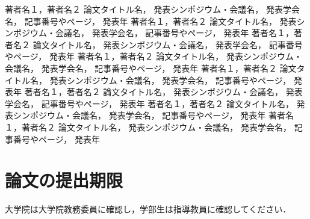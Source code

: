 \documentclass[a4paper]{jsarticle}
\begin{document}
\begin{thebibliography}{999}
  著者名１，著者名２
  論文タイトル名，
  発表シンポジウム・会議名，
  発表学会名，
  記事番号やページ，
  発表年
  著者名１，著者名２
  論文タイトル名，
  発表シンポジウム・会議名，
  発表学会名，
  記事番号やページ，
  発表年
  著者名１，著者名２
  論文タイトル名，
  発表シンポジウム・会議名，
  発表学会名，
  記事番号やページ，
  発表年
  著者名１，著者名２
  論文タイトル名，
  発表シンポジウム・会議名，
  発表学会名，
  記事番号やページ，
  発表年
  著者名１，著者名２
  論文タイトル名，
  発表シンポジウム・会議名，
  発表学会名，
  記事番号やページ，
  発表年
  著者名１，著者名２
  論文タイトル名，
  発表シンポジウム・会議名，
  発表学会名，
  記事番号やページ，
  発表年
  著者名１，著者名２
  論文タイトル名，
  発表シンポジウム・会議名，
  発表学会名，
  記事番号やページ，
  発表年
  著者名１，著者名２
  論文タイトル名，
  発表シンポジウム・会議名，
  発表学会名，
  記事番号やページ，
  発表年

\end{thebibliography}

\section*{論文の提出期限}
大学院は大学院教務委員に確認し，学部生は指導教員に確認してください．
\end{document}
